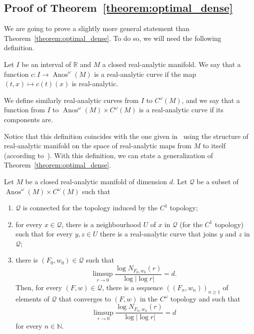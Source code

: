 \documentclass[AHL,Unicode,longabstracts,published]{cedram}
\DeclareMathOperator{\Anos}{Anos}
\newcommand{\clQ}{\mathcal{Q}}
\newcommand{\bbN}{\mathbb{N}}
\newcommand{\bbR}{\mathbb{R}}
\newcommand*{\romanenumi}{\renewcommand*{\theenumi}{\roman{enumi}}}
\begin{document}
\subsection{Proof of Theorem~\ref{theorem:optimal_dense}}\label{subsection:optimal_dense}

We are going to prove a slightly more general statement than Theorem~\ref{theorem:optimal_dense}. To do so, we will need the following definition.

\begin{defi}\label{definition:analytic_curve}
Let $I$ be an interval of $\bbR$ and $M$ a closed real-analytic manifold. We say that a function $c : I \to \Anos^\omega(M)$ is a real-analytic curve if the map $(t,x) \mapsto c(t)(x)$ is real-analytic.

We define similarly real-analytic curves from $I$ to $C^\omega(M)$, and we say that a function from $I$ to $\Anos^\omega(M) \times C^\omega(M)$ is a real-analytic curve if its components are.
\end{defi}

Notice that this definition coincides with the one given in~\cite{kriegl_michor_real_analytic} using the structure of real-analytic manifold on the space of real-analytic maps from $M$ to itself (according to~\cite[Lemma~8.6]{kriegl_michor_real_analytic}). With this definition, we can state a generalization of Theorem~\ref{theorem:optimal_dense}.

\begin{theo}\label{theorem:more_general}
Let $M$ be a closed real-analytic manifold of dimension $d$. Let $\clQ$ be a subset of $\Anos^\omega(M) \times C^\omega(M)$ such that
\begin{enumerate}\romanenumi
\item\label{theo4.5.1} $\clQ$ is connected for the topology induced by the $C^1$ topology;
\item\label{theo4.5.2} for every $x \in \clQ$, there is a neighbourhood $U$ of $x$ in $\clQ$ (for the $C^1$ topology) such that for every $y,z \in U$ there is a real-analytic curve that joins $y$ and $z$ in $\clQ$;
\item\label{theo4.5.3} there is $(F_0,w_0) \in \clQ$ such that
\begin{equation*}
\limsup_{r \to 0} \frac{\log N_{F_0,w_0}(r)}{\log |\log r|} = d.
\end{equation*}
Then, for every $(F,w) \in \clQ$, there is a sequence $((F_n,w_n))_{n \geq 1}$ of elements of $\clQ$ that converges to $(F,w)$ in the $C^\omega$ topology and such that
\begin{equation*}
\limsup_{r \to 0} \frac{\log N_{F_n,w_n}(r)}{\log |\log r|} = d
\end{equation*}
for every $n \in \bbN$.
\end{enumerate}
\end{theo}
\end{document}
